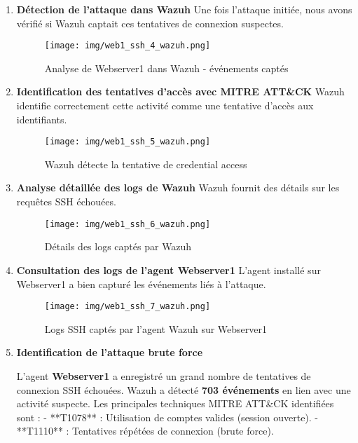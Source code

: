 \documentclass[a4paper,12pt]{report}
\begin{document}
\begin{enumerate}
\item \textbf{Détection de l’attaque dans Wazuh} \newline
Une fois l’attaque initiée, nous avons vérifié si Wazuh captait ces tentatives de connexion suspectes.
\begin{figure}[H]
    \centering
    \texttt{[image: img/web1\_ssh\_4\_wazuh.png]}
    \caption{Analyse de Webserver1 dans Wazuh - événements captés}
\end{figure}

\item \textbf{Identification des tentatives d’accès avec MITRE ATT\&CK} \newline
Wazuh identifie correctement cette activité comme une tentative d'accès aux identifiants.
\begin{figure}[H]
    \centering
    \texttt{[image: img/web1\_ssh\_5\_wazuh.png]}
    \caption{Wazuh détecte la tentative de credential access}
\end{figure}

\item \textbf{Analyse détaillée des logs de Wazuh} \newline
Wazuh fournit des détails sur les requêtes SSH échouées.
\begin{figure}[H]
    \centering
    \texttt{[image: img/web1\_ssh\_6\_wazuh.png]}
    \caption{Détails des logs captés par Wazuh}
\end{figure}

\item \textbf{Consultation des logs de l’agent Webserver1} \newline
L’agent installé sur Webserver1 a bien capturé les événements liés à l’attaque.
\begin{figure}[H]
    \centering
    \texttt{[image: img/web1\_ssh\_7\_wazuh.png]}
    \caption{Logs SSH captés par l’agent Wazuh sur Webserver1}
\end{figure}

\item \textbf{Identification de l'attaque brute force}  

    L'agent \textbf{Webserver1} a enregistré un grand nombre de tentatives de connexion SSH échouées. Wazuh a détecté \textbf{703 événements} en lien avec une activité suspecte. Les principales techniques MITRE ATT\&CK identifiées sont :  
    - **T1078** : Utilisation de comptes valides (session ouverte).  
    - **T1110** : Tentatives répétées de connexion (brute force).  


\end{enumerate}
\end{document}
